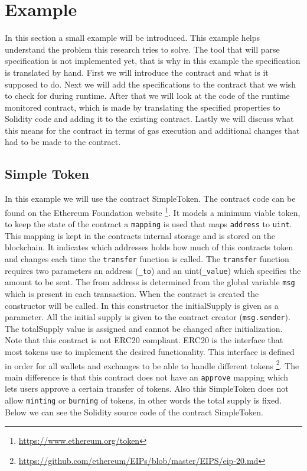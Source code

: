 \documentclass[a4paper]{article}
\begin{document}
\section{Example}
\label{sec:example}
In this section a small example will be introduced. This example helps understand the problem this research tries to solve. The tool that will parse specification is not implemented yet, that is why in this example the specification is translated by hand. First we will introduce the contract and what is it supposed to do. Next we will add the specifications to the contract that we wish to check for during runtime. After that we will look at the code of the runtime monitored contract, which is made by translating the specified properties to Solidity code and adding it to the existing contract. Lastly we will discuss what this means for the contract in terms of gas execution and additional changes that had to be made to the contract.

\subsection{Simple Token}
In this example we will use the contract SimpleToken. The contract code can be found on the Ethereum Foundation website \footnote{\url{https://www.ethereum.org/token}}. 
It models a minimum viable token, to keep the state of the contract a \texttt{mapping} is used that maps \texttt{address} to \texttt{uint}. This mapping is kept in the contracts internal storage and is stored on the blockchain. It indicates which addresses holds how much of this contracts token and changes each time the \texttt{transfer} function is called. The \texttt{transfer} function requires two parameters an address (\texttt{\_to})  and an uint(\texttt{\_value}) which specifies the amount to be sent. The from address is determined from the global variable \texttt{msg} which is present in each transaction. When the contract is created the constructor will be called. In this constructor the initialSupply is given as a parameter. All the initial supply is given to the contract creator (\texttt{msg.sender}). The totalSupply value is assigned and cannot be changed after initialization.\\
Note that this contract is not ERC20 compliant. ERC20 is the interface that most tokens use to implement the desired functionality. This interface is defined in order for all wallets and exchanges to be able to handle different tokens \footnote{\url{https://github.com/ethereum/EIPs/blob/master/EIPS/eip-20.md}}. The main difference is that this contract does not have an \texttt{approve} mapping which lets users approve a certain transfer of tokens. Also this SimpleToken does not allow \texttt{minting} or \texttt{burning} of tokens, in other words the total supply is fixed. Below we can see the Solidity source code of the contract SimpleToken.
\end{document}
